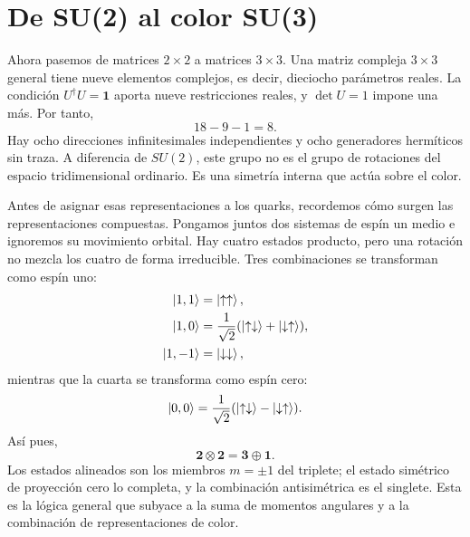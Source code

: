 \begin{classroomqa}
\end{classroomqa}

\section{De SU(2) al color SU(3)}

Ahora pasemos de matrices \(2\times2\) a matrices \(3\times3\). Una matriz compleja \(3\times3\) general tiene nueve elementos complejos, es decir, dieciocho parámetros reales. La condición \(U^\dagger U=\boldsymbol 1\) aporta nueve restricciones reales, y \(\det U=1\) impone una más. Por tanto,
\begin{equation}
18-9-1=8.
\end{equation}
Hay ocho direcciones infinitesimales independientes y ocho generadores hermíticos sin traza. A diferencia de \(SU(2)\), este grupo no es el grupo de rotaciones del espacio tridimensional ordinario. Es una simetría interna que actúa sobre el color.

Antes de asignar esas representaciones a los quarks, recordemos cómo surgen las representaciones compuestas. Pongamos juntos dos sistemas de espín un medio e ignoremos su movimiento orbital. Hay cuatro estados producto, pero una rotación no mezcla los cuatro de forma irreducible. Tres combinaciones se transforman como espín uno:
\begin{align}
\left\lvert1,1\right\rangle&=\left\lvert\uparrow\uparrow\right\rangle,\\
\left\lvert1,0\right\rangle&=\frac{1}{\sqrt2}
(\left\lvert\uparrow\downarrow\right\rangle+\left\lvert\downarrow\uparrow\right\rangle),\\
\left\lvert1,-1\right\rangle&=\left\lvert\downarrow\downarrow\right\rangle,
\end{align}
mientras que la cuarta se transforma como espín cero:
\begin{equation}
\left\lvert0,0\right\rangle=\frac{1}{\sqrt2}
(\left\lvert\uparrow\downarrow\right\rangle-\left\lvert\downarrow\uparrow\right\rangle).
\end{equation}
Así pues,
\begin{equation}
\boldsymbol 2\otimes\boldsymbol 2
=\boldsymbol 3\oplus\boldsymbol 1.
\label{eq:l4-two-spin-decomposition}
\end{equation}
Los estados alineados son los miembros \(m=\pm1\) del triplete; el estado simétrico de proyección cero lo completa, y la combinación antisimétrica es el singlete. Esta es la lógica general que subyace a la suma de momentos angulares y a la combinación de representaciones de color.

